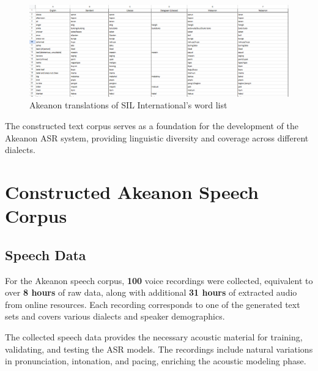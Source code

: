 \begin{figure}[H]
    \centering
    \includegraphics[width=\textwidth]{./figures/SIL.png}
    \caption{Akeanon translations of SIL International's word list}
    \label{fig:sil-list}
\end{figure}

The constructed text corpus serves as a foundation for the development of the Akeanon ASR system, providing linguistic diversity and coverage across different dialects.

\section{Constructed Akeanon Speech Corpus}

\subsection{Speech Data}
For the Akeanon speech corpus, \textbf{100} voice recordings were collected, equivalent to over \textbf{8 hours} of raw data, along with additional \textbf{31 hours} of extracted audio from online resources. Each recording corresponds to one of the generated text sets and covers various dialects and speaker demographics.

The collected speech data provides the necessary acoustic material for training, validating, and testing the ASR models. The recordings include natural variations in pronunciation, intonation, and pacing, enriching the acoustic modeling phase.

